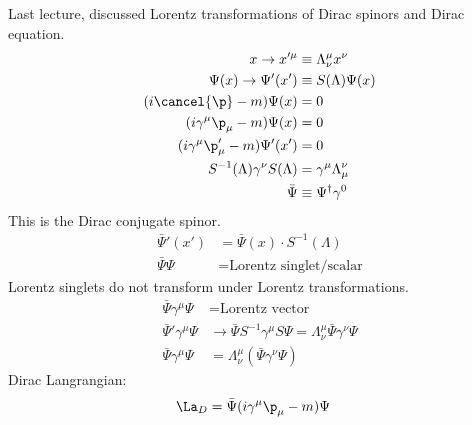 \documentclass[a4paper, 11pt, normalem]{report}
\begin{document}
\chapter{}

\chapter{}
Last lecture, discussed Lorentz transformations of Dirac spinors and Dirac equation.
\begin{align}
    x\to x'^\mu&\equiv \Lambda^\mu_\nu x^\nu \\
    \Psi(x) \to \Psi'(x')&\equiv S(\Lambda)\Psi(x) \\
    (i\cancel{\p}-m)\Psi(x) &= 0 \\
    (i\gamma^\mu\p_\mu - m)\Psi(x) &= 0 \\
    (i\gamma^\mu\p_\mu' -m)\Psi'(x') &= 0 \\
    S^{-1}(\Lambda)\gamma^\nu S(\Lambda) &= \gamma^\mu\Lambda^\nu_\mu \\
    \bar{\Psi} &\equiv \Psi^\dagger\gamma^0
\end{align}
This is the Dirac conjugate spinor.
\begin{align}
    \bar{\Psi}'(x') &= \bar{\Psi}(x)\cdot S^{-1}(\Lambda) \\
    \bar{\Psi}\Psi &= \text{Lorentz singlet/scalar}
\end{align}
Lorentz singlets do not transform under Lorentz transformations.
\begin{align}
    \bar{\Psi}\gamma^\mu\Psi &= \text{Lorentz vector} \\
    \bar{\Psi}'\gamma^\mu\Psi &\to \bar{\Psi}S^{-1}\gamma^\mu S\Psi = \Lambda^\mu_\nu \bar{\Psi}\gamma^\nu\Psi \\
    \bar{\Psi}\gamma^\mu\Psi &= \Lambda^\mu_\nu(\bar{\Psi}\gamma^\nu\Psi)
\end{align}
Dirac Langrangian:
\begin{align}
    \La_D &= \bar{\Psi}(i\gamma^\mu\p_\mu - m)\Psi
\end{align}
\end{document}

